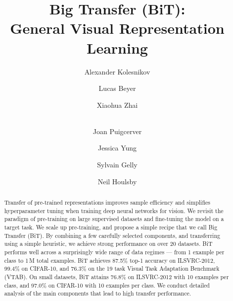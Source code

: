 \documentclass[runningheads]{llncs}
\newcommand{\name}{{BiT}}
\newcommand{\imagenet}{{ILSVRC-2012}}
\begin{document}
\pagestyle{headings}
\mainmatter
\def\ECCVSubNumber{3665}  

\title{Big Transfer (BiT): \\ General Visual Representation Learning}

\begin{comment}
\titlerunning{ECCV-20 submission ID \ECCVSubNumber} 
\authorrunning{ECCV-20 submission ID \ECCVSubNumber} 
\author{Anonymous ECCV submission}
\institute{Paper ID \ECCVSubNumber}
\end{comment}


\author{Alexander Kolesnikov \and
Lucas Beyer\makebox[0pt]{\hspace{5pt}} \and
Xiaohua Zhai\makebox[0pt]{\hspace{5pt}} \and \\
Joan Puigcerver\makebox[0pt]{\hspace{5pt}} \and
Jessica Yung \and
Sylvain Gelly \and
Neil Houlsby}


\maketitle              \begin{abstract}
Transfer of pre-trained representations improves sample efficiency and simplifies hyperparameter tuning when training deep neural networks for vision. 
We revisit the paradigm of pre-training on large supervised datasets and fine-tuning the model on a target task. 
We scale up pre-training, and propose a simple recipe that we call Big Transfer (\name{}).
By combining a few carefully selected components, and transferring using a simple heuristic, we achieve strong performance on over 20 datasets.
\name{} performs well across a surprisingly wide range of data regimes --- from 1 example per class to 1\,M total examples. 
\name{} achieves 87.5\% top-1 accuracy on \imagenet{}, 99.4\% on CIFAR-10, and 76.3\% on the 19 task Visual Task Adaptation Benchmark (VTAB).
On small datasets, \name{} attains 76.8\% on \imagenet{} with 10 examples per class, and 97.0\% on CIFAR-10 with 10 examples per class.
We conduct detailed analysis of the main components that lead to high transfer performance.
\end{abstract}
\end{document}
